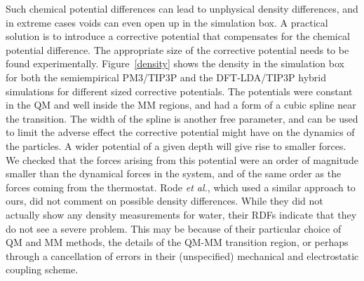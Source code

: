 \documentclass[11pt]{revtex4}
\begin{document}
Such chemical potential differences can lead to unphysical density differences, and in extreme cases voids can even open up in the simulation box. A practical solution is to introduce a corrective potential that compensates for the chemical potential difference. The appropriate size of the corrective potential needs to be found experimentally. Figure~\ref{density} shows the density in the simulation box for both the semiempirical PM3/TIP3P and the DFT-LDA/TIP3P hybrid simulations for different sized corrective potentials. The potentials were constant in the QM and well inside the MM regions, and had a form of a cubic spline near the transition. The width of the spline is another free parameter, and can be used to limit the adverse effect the corrective potential might have on the dynamics of the particles. A wider potential of a given depth will give rise to smaller forces. We checked that the forces arising from this potential were an order of magnitude smaller than the dynamical forces in the system, and of the same order as the forces coming from the thermostat.  Rode {\it et al.}, which used a similar approach to ours, did not comment on possible density differences.  While they did not actually show any density measurements for water\cite{xenides_j_chem_phys_2005a,xenides_j_mol_liq_2006a}, their RDFs indicate that they do not see a severe problem.  This may be because of their particular choice of QM and MM methods, the details of the QM-MM transition region, or perhaps through a cancellation of errors in their (unspecified) mechanical and electrostatic coupling scheme.
\end{document}
